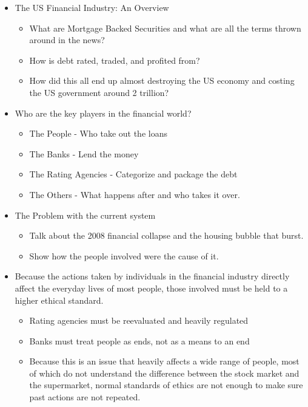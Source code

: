 \documentclass[11pt]{article}
\begin{document}
\begin{itemize}
\item The US Financial Industry: An Overview
\begin{itemize}
   \item What are Mortgage Backed Securities and what are all the terms thrown around in the news?
   \item How is debt rated, traded, and profited from?
   \item How did this all end up almost destroying the US economy and costing the US government around 2 trillion?
\end{itemize}
\item Who are the key players in the financial world?
\begin{itemize}
   \item The People - Who take out the loans
   \item The Banks - Lend the money
   \item The Rating Agencies - Categorize and package the debt
   \item The Others - What happens after and who takes it over.
\end{itemize}
\item The Problem with the current system
\begin{itemize}
   \item Talk about the 2008 financial collapse and the housing bubble that burst.
   \item Show how the people involved were the cause of it.
\end{itemize}
\item Because the actions taken by individuals in the financial industry directly affect the everyday lives of most people, those involved must be held to a higher ethical standard.
\begin{itemize}
   \item Rating agencies must be reevaluated and heavily regulated
   \item Banks must treat people as ends, not as a means to an end \cite{kant}
   \item Because this is an issue that heavily affects a wide range of people, most of which do not understand the difference between the stock market and the supermarket, normal standards of ethics are not enough to make sure past actions are not repeated.
\end{itemize}
\end{itemize}
\newpage
\nocite{texTemp}
\nocite{BibTex}
\nocite{BibMang}
\nocite{bibStyle}




\end{document}
